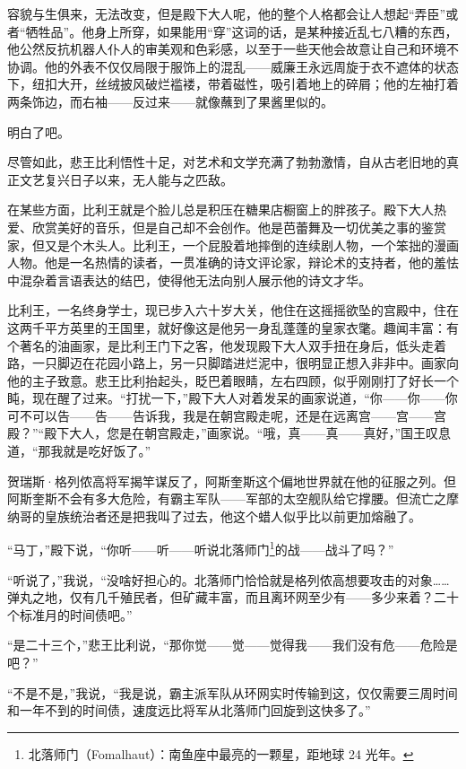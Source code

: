\documentclass[AutoFakeBold=true]{book}
\begin{document}
容貌与生俱来，无法改变，但是殿下大人呢，他的整个人格都会让人想起``弄臣''或者``牺牲品''。他身上所穿，如果能用``穿''这词的话，是某种接近乱七八糟的东西，他公然反抗机器人仆人的审美观和色彩感，以至于一些天他会故意让自己和环境不协调。他的外表不仅仅局限于服饰上的混乱——威廉王永远周旋于衣不遮体的状态下，纽扣大开，丝绒披风破烂褴褛，带着磁性，吸引着地上的碎屑；他的左袖打着两条饰边，而右袖——反过来——就像蘸到了果酱里似的。

明白了吧。

尽管如此，悲王比利悟性十足，对艺术和文学充满了勃勃激情，自从古老旧地的真正文艺复兴日子以来，无人能与之匹敌。

在某些方面，比利王就是个脸儿总是积压在糖果店橱窗上的胖孩子。殿下大人热爱、欣赏美好的音乐，但是自己却不会创作。他是芭蕾舞及一切优美之事的鉴赏家，但又是个木头人。比利王，一个屁股着地摔倒的连续剧人物，一个笨拙的漫画人物。他是一名热情的读者，一贯准确的诗文评论家，辩论术的支持者，他的羞怯中混杂着言语表达的结巴，使得他无法向别人展示他的诗文才华。

比利王，一名终身学士，现已步入六十岁大关，他住在这摇摇欲坠的宫殿中，住在这两千平方英里的王国里，就好像这是他另一身乱蓬蓬的皇家衣氅。趣闻丰富：有个著名的油画家，是比利王门下之客，他发现殿下大人双手扭在身后，低头走着路，一只脚迈在花园小路上，另一只脚踏进烂泥中，很明显正想入非非中。画家向他的主子致意。悲王比利抬起头，眨巴着眼睛，左右四顾，似乎刚刚打了好长一个盹，现在醒了过来。``打扰一下，''殿下大人对着发呆的画家说道，``你——你——你可不可以告——告——告诉我，我是在朝宫殿走呢，还是在远离宫——宫——宫殿？''``殿下大人，您是在朝宫殿走，''画家说。``哦，真——真——真好，''国王叹息道，``那我就是吃好饭了。''

\vspace*{1em}

贺瑞斯·格列侬高将军揭竿谋反了，阿斯奎斯这个偏地世界就在他的征服之列。但阿斯奎斯不会有多大危险，有霸主军队——军部的太空舰队给它撑腰。但流亡之摩纳哥的皇族统治者还是把我叫了过去，他这个蜡人似乎比以前更加熔融了。

``马丁，''殿下说，``你听——听——听说北落师门\footnote{北落师门（Fomalhaut）：南鱼座中最亮的一颗星，距地球 24 光年。}的战——战斗了吗？''

``听说了，''我说，``没啥好担心的。北落师门恰恰就是格列侬高想要攻击的对象……弹丸之地，仅有几千殖民者，但矿藏丰富，而且离环网至少有——多少来着？二十个标准月的时间债吧。''

``是二十三个，''悲王比利说，``那你觉——觉——觉得我——我们没有危——危险是吧？''

``不是不是，''我说，``我是说，霸主派军队从环网实时传输到这，仅仅需要三周时间和一年不到的时间债，速度远比将军从北落师门回旋到这快多了。''
\end{document}
